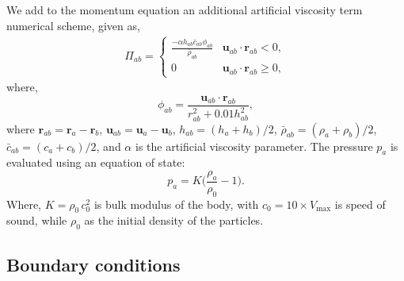 \documentclass[preprint,12pt]{elsarticle}
\newcommand{\ten}[1]{\ensuremath{\mathbf{#1}}}
\begin{document}
We add to the momentum equation an additional artificial viscosity term
numerical scheme, given as,
\begin{align}
  \label{eq:mom-av}
  \Pi_{ab} =
  \begin{cases}
\frac{-\alpha h_{ab} \bar{c}_{ab} \phi_{ab}}{\bar{\rho}_{ab}}
  & \ten{u}_{ab}\cdot \ten{r}_{ab} < 0, \\
  0 & \ten{u}_{ab}\cdot \ten{r}_{ab} \ge 0,
\end{cases}
\end{align}
where,
%
\begin{equation}
  \label{eq:av-phiij}
  \phi_{ab} = \frac{\ten{u}_{ab} \cdot \ten{r}_{ab}}{r^2_{ab} + 0.01 h^2_{ab}},
\end{equation}
%
where $\ten{r}_{ab} = \ten{r}_a - \ten{r}_b$,
$\ten{u}_{ab} = \ten{u}_a - \ten{u}_b$, $h_{ab} = (h_a + h_b)/2$,
$\bar{\rho}_{ab} = (\rho_a + \rho_b)/2$, $\bar{c}_{ab} = (c_a + c_b) / 2$, and
$\alpha$ is the artificial viscosity parameter.  The pressure $p_a$ is evaluated
using an equation of state:
\begin{equation}
\label{eqn:sph-eos}
  p_a = K \bigg(\frac{\rho_a}{\rho_{0}} - 1 \bigg).
\end{equation}
Where, $K=\rho_0 \, c_0^2$ is bulk modulus of the body, with
$c_0=10 \times V_{\text{max}}$ is speed of sound, while $\rho_0$ as the
initial density of the particles.


\FloatBarrier%
\subsection{Boundary conditions}
\label{sec:boundary_conditions}


\FloatBarrier%
\end{document}
